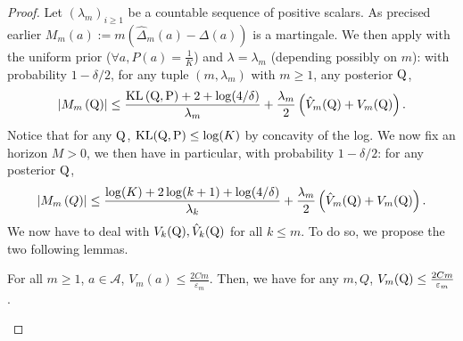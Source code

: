 \begin{noaddcontents}
\begin{proof}
Let $(\lambda_m)_{i\geq 1}$ be a countable sequence of positive scalars.
As precised earlier $M_m(a):= m\left(\hat{\Delta}_m(a)-\Delta(a)\right)$ is a martingale.
We then apply  with the uniform prior ($\forall a, P(a)= \frac{1}{K}$) and $\lambda= \lambda_m$  (depending possibly on $m$): with probability $1- \delta/2$, for any tuple $(m,\lambda_m)$ with $m\geq 1$, any posterior $\mathrm{Q}$,
\begin{align*}
\left|M_m\left(\mathrm{Q}\right)\right| \leq \frac{\operatorname{KL}\left(\mathrm{Q}, \mathrm{P}\right)+2 +\log (4/\delta)}{\lambda_m}+ \frac{\lambda_m}{2}\left( \hat{V}_m(\mathrm{Q}) + V_m(\mathrm{Q}) \right).
\end{align*}
Notice that for any $\mathrm{Q}$, $\operatorname{KL}(\mathrm{Q},\mathrm{P})\leq \log(K)$ by concavity of the log.
We now fix an horizon $M>0$, we then have in particular, with probability $1- \delta/2$: for any posterior $\mathrm{Q}$,
\begin{align*}
\left|M_m\left(Q\right)\right| \leq \frac{\log(K)+2 \log (k+1)+\log (4/\delta)}{\lambda_k}+ \frac{\lambda_m}{2}\left( \hat{V}_m(\mathrm{Q}) + V_m(\mathrm{Q}) \right).
\end{align*}
We now have to deal with $V_k(\mathrm{Q}), \hat{V}_k(\mathrm{Q})$ for all $k\leq m$. To do so, we propose the two following lemmas.
\begin{lemma}
\label{l: bandit_lemma_1}
For all $m\geq 1$, $a\in\mathcal{A}$, $V_m(a)\leq \frac{2Cm}{\varepsilon_m}$.
Then, we have for any $m,Q$, $V_m(\mathrm{Q})\leq \frac{2Cm}{\varepsilon_m}$.
\end{lemma}


\end{proof}
\end{noaddcontents}
